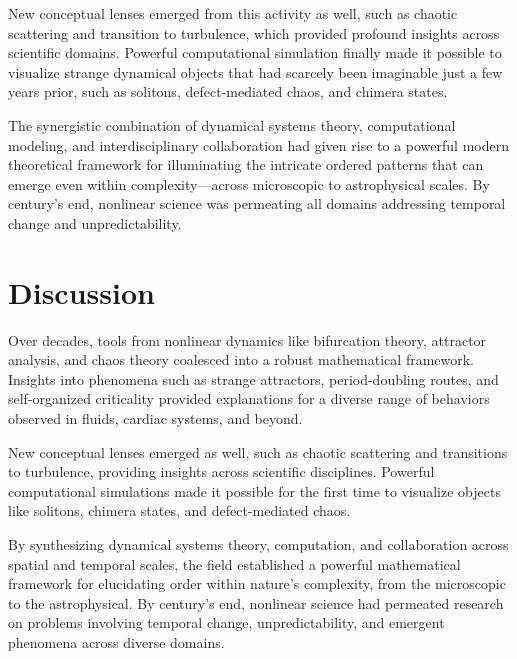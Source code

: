 New conceptual lenses emerged from this activity as well, such as chaotic scattering and transition to turbulence, which provided profound insights across scientific domains. Powerful computational simulation finally made it possible to visualize strange dynamical objects that had scarcely been imaginable just a few years prior, such as solitons, defect-mediated chaos, and chimera states.

The synergistic combination of dynamical systems theory, computational modeling, and interdisciplinary collaboration had given rise to a powerful modern theoretical framework for illuminating the intricate ordered patterns that can emerge even within complexity—across microscopic to astrophysical scales. By century's end, nonlinear science was permeating all domains addressing temporal change and unpredictability.

\section{Discussion}

Over decades, tools from nonlinear dynamics like bifurcation theory, attractor analysis, and chaos theory coalesced into a robust mathematical framework. Insights into phenomena such as strange attractors, period-doubling routes, and self-organized criticality provided explanations for a diverse range of behaviors observed in fluids, cardiac systems, and beyond.

New conceptual lenses emerged as well, such as chaotic scattering and transitions to turbulence, providing insights across scientific disciplines. Powerful computational simulations made it possible for the first time to visualize objects like solitons, chimera states, and defect-mediated chaos.

By synthesizing dynamical systems theory, computation, and collaboration across spatial and temporal scales, the field established a powerful mathematical framework for elucidating order within nature's complexity, from the microscopic to the astrophysical. By century's end, nonlinear science had permeated research on problems involving temporal change, unpredictability, and emergent phenomena across diverse domains.